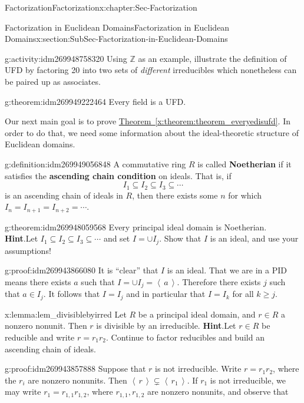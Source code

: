 \documentclass[oneside,10pt,]{book}
\newcommand{\terminology}[1]{\textbf{#1}}
\numberwithin{equation}{section}
\renewcommand{\geq}{\geqslant}
\newcommand{\ideal}[1]{\left\langle\, #1 \,\right\rangle}
\def\Z{{\mathbb Z}}
\begin{document}
\begin{chapterptx}{Factorization}{}{Factorization}{}{}{x:chapter:Sec-Factorization}
\begin{sectionptx}{Factorization in Euclidean Domains}{}{Factorization in Euclidean Domains}{}{}{x:section:SubSec-Factorization-in-Euclidean-Domains}
\begin{activity}{}{g:activity:idm269948758320}%
Using \(\Z\) as an example, illustrate the definition of UFD by factoring 20 into two sets of \emph{different} irreducibles which nonetheless can be paired up as associates.%
\end{activity}
\begin{theorem}{}{}{g:theorem:idm269949222464}%
Every field is a UFD.%
\end{theorem}
Our next main goal is to prove \hyperref[x:theorem:theorem_everyedisufd]{Theorem~\ref{x:theorem:theorem_everyedisufd}}. In order to do that, we need some information about the ideal-theoretic structure of Euclidean domains.%
\begin{definition}{}{g:definition:idm269949056848}%
A commutative ring \(R\) is called \terminology{Noetherian} if it satisfies the \terminology{ascending chain condition} on ideals. That is, if%
\begin{equation*}
I_1 \subseteq I_2\subseteq I_3\subseteq \cdots
\end{equation*}
is an ascending chain of ideals in \(R\), then there exists some \(n\) for which \(I_n = I_{n+1} = I_{n+2} = \cdots\).%
\end{definition}
\begin{theorem}{}{}{g:theorem:idm269948059568}%
Every principal ideal domain is Noetherian.%
\textbf{Hint}.\quad{}Let \(I_1\subseteq I_2\subseteq I_3 \subseteq \cdots\) and set \(I = \cup I_j\). Show that \(I\) is an ideal, and use your assumptions!%
\end{theorem}
\begin{proofptx}{}{g:proof:idm269943866080}
It is ``clear'' that \(I\) is an ideal. That we are in a PID means there exists \(a\) such that \(I=\cup I_j=\ideal{a}\). Therefore there exists \(j\) such that \(a\in I_j\). It follows that \(I=I_j\) and in particular that \(I=I_k\) for all \(k\geq j\).%
\end{proofptx}
\begin{lemma}{}{}{x:lemma:lem_divisiblebyirred}%
Let \(R\) be a principal ideal domain, and \(r\in R\) a nonzero nonunit. Then \(r\) is divisible by an irreducible.%
\textbf{Hint}.\quad{}Let \(r\in R\) be reducible and write \(r = r_1 r_2\). Continue to factor reducibles and build an ascending chain of ideals.%
\end{lemma}
\begin{proofptx}{}{g:proof:idm269943857888}
Suppose that \(r\) is not irreducible. Write \(r = r_1 r_2\), where the \(r_i\) are nonzero nonunits. Then \(\ideal{r} \subsetneq \ideal{r_1}\). If \(r_1\) is not irreducible, we may write \(r_1 = r_{1,1}r_{1,2}\), where \(r_{1,1},r_{1,2}\) are nonzero nonunits, and observe that%

\end{proofptx}
\end{sectionptx}
\end{chapterptx}
\end{document}
